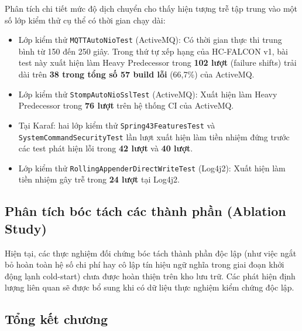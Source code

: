 Phân tích chi tiết mức độ dịch chuyển cho thấy hiện tượng trễ tập trung vào một số lớp kiểm thử cụ thể có thời gian chạy dài:
\begin{itemize}
    \item Lớp kiểm thử \texttt{MQTTAutoNioTest} (ActiveMQ): Có thời gian thực thi trung bình từ 150 đến 250 giây. Trong thứ tự xếp hạng của HC-FALCON v1, bài test này xuất hiện làm Heavy Predecessor trong \textbf{102 lượt} (failure shifts) trải dài trên \textbf{38 trong tổng số 57 build lỗi} (66,7\%) của ActiveMQ.
    \item Lớp kiểm thử \texttt{StompAutoNioSslTest} (ActiveMQ): Xuất hiện làm Heavy Predecessor trong \textbf{76 lượt} trên hệ thống CI của ActiveMQ.
    \item Tại Karaf: hai lớp kiểm thử \texttt{Spring43FeaturesTest} và \texttt{SystemCommandSecurityTest} lần lượt xuất hiện làm tiền nhiệm đứng trước các test phát hiện lỗi trong \textbf{42 lượt} và \textbf{40 lượt}.
    \item Lớp kiểm thử \texttt{RollingAppenderDirectWriteTest} (Log4j2): Xuất hiện làm tiền nhiệm gây trễ trong \textbf{24 lượt} tại Log4j2.
\end{itemize}

\subsection{Phân tích bóc tách các thành phần (Ablation Study)}
\label{subsec:ablation}


Hiện tại, các thực nghiệm đối chứng bóc tách thành phần độc lập (như việc ngắt bỏ hoàn toàn hệ số chi phí hay cô lập tín hiệu ngữ nghĩa trong giai đoạn khởi động lạnh cold-start) chưa được hoàn thiện trên kho lưu trữ. Các phát hiện định lượng liên quan sẽ được bổ sung khi có dữ liệu thực nghiệm kiểm chứng độc lập.

\subsection{Tổng kết chương}
\label{subsec:experiments_summary}

